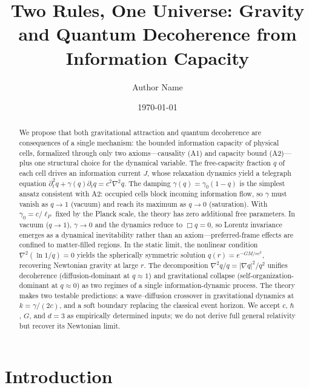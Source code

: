 \documentclass[aps,prd,twocolumn,showpacs,superscriptaddress,preprintnumbers]{revtex4-2}
\begin{document}
\title{Two Rules, One Universe: Gravity and Quantum Decoherence from Information Capacity}

\author{Author Name}

\date{\today}

\begin{abstract}
We propose that both gravitational attraction and quantum decoherence are consequences of a single mechanism: the bounded information capacity of physical cells, formalized through only two axioms---causality (A1) and capacity bound (A2)---plus one structural choice for the dynamical variable.
The free-capacity fraction $q$ of each cell drives an information current $J$, whose relaxation dynamics yield a telegraph equation $\partial_t^2 q + \gamma(q)\partial_t q = c^2\nabla^2 q$.
The damping $\gamma(q)=\gamma_0(1-q)$ is the simplest ansatz consistent with A2: occupied cells block incoming information flow, so $\gamma$ must vanish as $q\to 1$ (vacuum) and reach its maximum as $q\to 0$ (saturation).
With $\gamma_0=c/\ell_P$ fixed by the Planck scale, the theory has zero additional free parameters.
In vacuum ($q\to 1$), $\gamma\to 0$ and the dynamics reduce to $\Box q=0$, so Lorentz invariance emerges as a dynamical inevitability rather than an axiom---preferred-frame effects are confined to matter-filled regions.
In the static limit, the nonlinear condition $\nabla^2(\ln 1/q)=0$ yields the spherically symmetric solution $q(r)=e^{-GM/rc^2}$, recovering Newtonian gravity at large $r$.
The decomposition $\nabla^2 q/q = |\nabla q|^2/q^2$ unifies decoherence (diffusion-dominant at $q\approx 1$) and gravitational collapse (self-organization-dominant at $q\approx 0$) as two regimes of a single information-dynamic process.
The theory makes two testable predictions: a wave--diffusion crossover in gravitational dynamics at $k=\gamma/(2c)$, and a soft boundary replacing the classical event horizon.
We accept $c$, $\hbar$, $G$, and $d=3$ as empirically determined inputs; we do not derive full general relativity but recover its Newtonian limit.
\end{abstract}

\maketitle

\section{Introduction}
\label{sec:intro}
\end{document}
